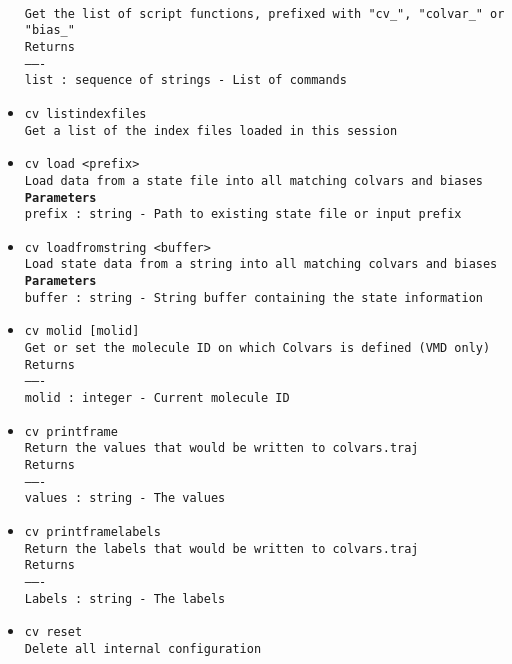\begin{itemize}
\\
\texttt{Get the list of script functions, prefixed with "cv\_", "colvar\_" or "bias\_"}
\\
\texttt{Returns}
\\
\texttt{-------}
\\
\texttt{list : sequence of strings - List of commands}
\item \texttt{cv listindexfiles}
\\
\texttt{Get a list of the index files loaded in this session}
\item \texttt{cv load <prefix>}
\\
\texttt{Load data from a state file into all matching colvars and biases}
\\
\texttt{\textbf{Parameters}}
\\
\texttt{prefix : string - Path to existing state file or input prefix}
\item \texttt{cv loadfromstring <buffer>}
\\
\texttt{Load state data from a string into all matching colvars and biases}
\\
\texttt{\textbf{Parameters}}
\\
\texttt{buffer : string - String buffer containing the state information}
\item \texttt{cv molid [molid]}
\\
\texttt{Get or set the molecule ID on which Colvars is defined (VMD only)}
\\
\texttt{Returns}
\\
\texttt{-------}
\\
\texttt{molid : integer - Current molecule ID}
\item \texttt{cv printframe}
\\
\texttt{Return the values that would be written to colvars.traj}
\\
\texttt{Returns}
\\
\texttt{-------}
\\
\texttt{values : string - The values}
\item \texttt{cv printframelabels}
\\
\texttt{Return the labels that would be written to colvars.traj}
\\
\texttt{Returns}
\\
\texttt{-------}
\\
\texttt{Labels : string - The labels}
\item \texttt{cv reset}
\\
\texttt{Delete all internal configuration}

\end{itemize}
